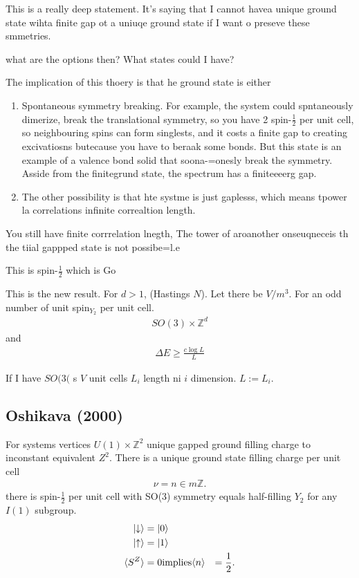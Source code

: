 This is a really deep statement.
It's saying that I cannot havea unique ground state wihta finite gap ot a uniuqe
ground state
if I want o preseve these smmetries.

what are the options then?
What states could I have?

The implication of this thoery is that he ground state is either
\begin{enumerate}
    \item Spontaneous symmetry breaking.
        For example, the system could spntaneously dimerize,
        break the translational symmetry,
        so you have 2 spin-$\frac{1}{2}$
        per unit cell,
        so neighbouring spins can form singlests,
        and it costs a finite gap to creating excivatiosns
        butecause you have to beraak some bonds.
        But this state is an example of a valence bond solid that soona-=onesly
        break the symmetry.
        Asside from the finitegrund state,
        the spectrum has a finiteeeerg gap.
    \item The other possibility is that hte systme is just gaplesss,
        which means tpower la correlations infinite correaltion length.
\end{enumerate}
You still have finite corrrelation lnegth,
The tower of aroanother onseuqneceis th the tiial gappped state is not
possibe=l.e

This is spin-$\frac{1}{2}$ which is Go

This is the new result.
For $d>1$,
(Hastings $N$).
Let there be $V/m^3$.
For an odd number of unit spin$_Y_2$  per unit cell.
\begin{align}
    SO(3) \times \mathbb{Z}^d
\end{align}
and
\begin{align}
    \Delta E \ge \frac{c\log L}{L}
\end{align}

If I have $SO(3($ s
$V$ unit cells $L_i$ length ni $i$ dimension.
$L:= L_i$.

\subsection{Oshikava (2000)}
For systems vertices $U(1)\times \mathbb{Z}^2$ unique gapped ground filling
charge to inconstant equivalent ${Z}^2$.
There is a unique ground state filling charge per unit cell
\begin{align}
    \nu = n \in m\mathbb{Z}.
\end{align}
there is spin-$\frac{1}{2}$ per unit cell with SO(3) symmetry
equals half-filling $Y_2$ for any $I(1)$ subgroup.
\begin{align}
    \ket{\downarrow} &= \ket{0}\\
    \ket{\uparrow} &= \ket{1}\\
    \langle S^Z\rangle &= 0
   \textrm{implies}
   \langle n\rangle &= \frac{1}{2}.
\end{align} 

